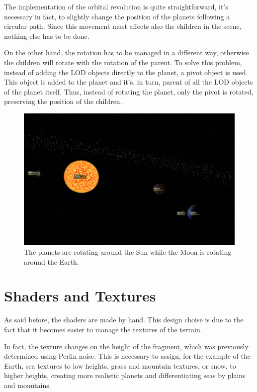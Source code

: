 \documentclass[paper=a4, fontsize=11pt]{scrartcl} %
\numberwithin{equation}{section} %
\numberwithin{figure}{section} %
\numberwithin{table}{section} %
\theoremstyle{definition}
\begin{document}
The implementation of the orbital revolution is quite straightforward, it's necessary
in fact, to slightly change the position of the planets following a
circular path. Since this movement must affects also the children in the scene,
nothing else has to be done.

On the other hand, the rotation has to be
managed in a different way, otherwise the children will rotate with the
rotation of the parent. To solve this problem, instead of adding the LOD objects
directly to the planet, a pivot object is used. This object is added to the
planet and it's, in turn, parent of all the LOD objects of the planet itself.
Thus, instead of
rotating the planet, only the pivot is rotated, preserving the position of
the children.

\begin{figure}
	\centering
	\includegraphics[scale=0.22]{images/solar_system.png}
	\caption{The planets are rotating around the Sun while the Moon is
		rotating around the Earth.}
	\label{fig:solar-system}
\end{figure}


\section{Shaders and Textures}

As said before, the shaders are made by hand. This design choise is due to
the fact that it becomes easier to manage the textures of the terrain.

In fact, the texture changes on the height of the fragment, which was previously
determined using Perlin noise. This is necessary to assign, for the example
of the Earth, sea textures to low
heights, grass and mountain textures, or snow, to higher heights, creating
more realistic planets and differentiating seas by plains and mountains.
\end{document}
